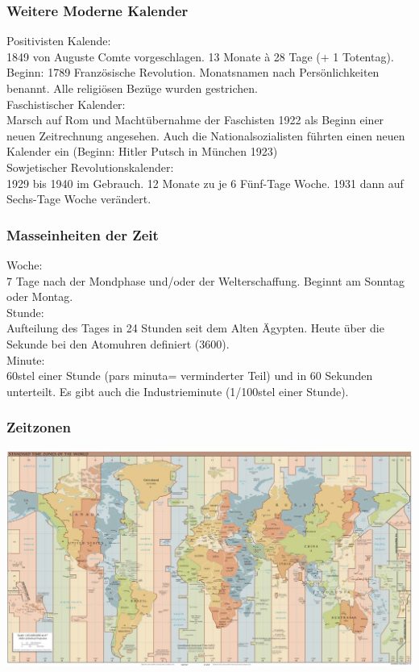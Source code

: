\documentclass[10pt, openright=true]{scrartcl}
\begin{document}
\subsubsection{Weitere Moderne Kalender}
Positivisten Kalende:\\
1849 von Auguste Comte vorgeschlagen. 13 Monate à 28 Tage (+ 1 Totentag). Beginn: 1789 Französische Revolution. Monatsnamen nach Persönlichkeiten benannt. Alle religiösen Bezüge wurden gestrichen.\\
Faschistischer Kalender:\\
Marsch auf Rom und Machtübernahme der Faschisten 1922 als Beginn einer neuen Zeitrechnung angesehen. Auch die Nationalsozialisten führten einen neuen Kalender ein (Beginn: Hitler Putsch in München 1923)\\
Sowjetischer Revolutionskalender:\\
1929 bis 1940 im Gebrauch. 12 Monate zu je 6 Fünf-Tage Woche. 1931 dann auf Sechs-Tage Woche verändert.
\subsubsection{Masseinheiten der Zeit}
Woche: \\
7 Tage nach der Mondphase und/oder der Welterschaffung. Beginnt am Sonntag oder Montag.\\
Stunde:\\
Aufteilung des Tages in 24 Stunden seit dem Alten Ägypten. Heute über die Sekunde bei den Atomuhren definiert (3600).\\
Minute:\\
60stel einer Stunde (pars minuta= verminderter Teil) und in 60 Sekunden unterteilt. Es gibt auch die Industrieminute (1/100stel einer Stunde).
\subsubsection{Zeitzonen}
\includegraphics[width=1\textwidth]{images/zeitzonen}
\end{document}
